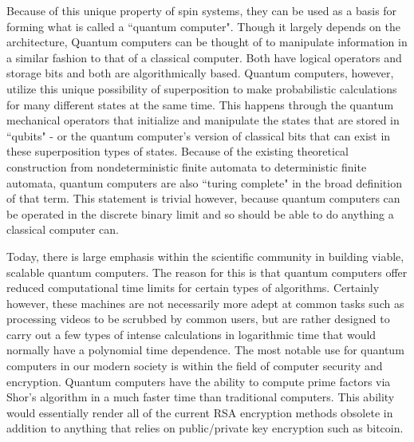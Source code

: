 \documentclass[oneside, astronomy, noacknowlegments]{BYUPhys}
\begin{document}
Because of this unique property of spin systems, they can be used as a basis for forming what is called a ``quantum computer". Though it largely depends on the architecture, Quantum computers can be thought of to manipulate information in a similar fashion to that of a classical computer. Both have logical operators and storage bits and both are algorithmically based. Quantum computers, however, utilize this unique possibility of superposition to make probabilistic calculations for many different states at the same time. This happens through the quantum mechanical operators that initialize and manipulate the states that are stored in ``qubits" - or the quantum computer's version of classical bits that can exist in these superposition types of states. Because of the existing theoretical construction from nondeterministic finite automata to deterministic finite automata, quantum computers are also ``turing complete" in the broad definition of that term. This statement is trivial however, because quantum computers can be operated in the discrete binary limit and so should be able to do anything a classical computer can.

Today, there is large emphasis within the scientific community in building viable, scalable quantum computers. The reason for this is that quantum computers offer reduced computational time limits for certain types of algorithms. Certainly however, these machines are not necessarily more adept at common tasks such as processing videos to be scrubbed by common users, but are rather designed to carry out a few types of intense calculations in logarithmic time that would normally have a polynomial time dependence. The most notable use for quantum computers in our modern society is within the field of computer security and encryption. Quantum computers have the ability to compute prime factors via Shor's algorithm in a much faster time than traditional computers. This ability would essentially render all of the current RSA encryption methods obsolete in addition to anything that relies on public/private key encryption such as bitcoin.
\end{document}
